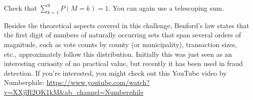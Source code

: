 \begin{exercise}
Check that $\sum_{k=1}^9 P(M = k) = 1$. You can again use a telescoping sum.
\end{exercise}


Besides the theoretical aspects covered in this challenge, Benford's law states that the first digit of numbers of naturally occurring sets that span several orders of magnitude, such as  vote counts by county (or municipality), transaction sizes, etc., approximately follow this distribution. Initially this was just seen as an interesting curiosity of no practical value, but recently it has been used in fraud detection. If you're interested, you might check out this YouTube video by Numberphile: \url{https://www.youtube.com/watch?v=XXjlR2OK1kM&ab_channel=Numberphile}
